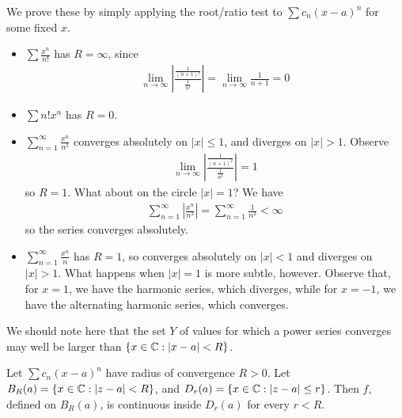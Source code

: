\documentclass{../template/note}
\begin{document}
    We prove these by simply applying the root/ratio test to \(\sum c_n (x-a)^n\) for some fixed \(x\).
    
    \begin{example*}
        \begin{itemize}
            \item \(\sum \frac{x^n}{n!}\) has \(R = \infty\), since 
            \begin{align*}
                \lim_{n \to \infty} \left|\frac{\frac 1{(n+1)!}}{\frac 1 {n!}}\right| = \lim_{n \to \infty} \frac 1 {n+1} = 0
            \end{align*}
            \item \(\sum n!x^n\) has \(R = 0\).
            \item \(\sum_{n=1}^\infty \frac{x^n}{n^2}\) converges absolutely on \(|x| \leq 1\), and diverges on \(|x| > 1\). Observe
            \begin{align*}
                \lim_{n \to \infty} \left|\frac{\frac 1 {(n+1)^2}}{\frac 1 {n^2}}\right| = 1
            \end{align*}
            so \(R = 1\). What about on the circle \(|x| = 1\)? We have
            \begin{align*}
                \sum_{n=1}^\infty \left|\frac{x^n}{n^2}\right| = \sum_{n=1}^\infty \frac 1 {n^2} < \infty
            \end{align*}
            so the series converges absolutely.
            \item \(\sum_{n=1}^\infty \frac{x^n}{n}\) has \(R=1\), so converges absolutely on \(|x| < 1\) and diverges on \(|x| > 1\). What happens when \(|x|=1\) is more subtle, however. Observe that, for \(x=1\), we have the harmonic series, which diverges, while for \(x=-1\), we have the alternating harmonic series, which converges.    
        \end{itemize}
    \end{example*}
    
    \begin{remark*}
        We should note here that the set \(Y\) of values for which a power series converges may well be larger than \(\{x \in \mathbb C: |x-a| < R\}\).
    \end{remark*}


    \begin{proposition}
        Let \(\sum c_n(x-a)^n\) have radius of convergence \(R > 0\). Let \(B_R(a) = \{x \in \mathbb C: |z-a| < R\}\), and \(D_r(a) = \{x \in \mathbb C: |z-a| \leq r\}\). Then \(f\), defined on \(B_R(a)\), is continuous inside \(D_r(a)\) for every \(r < R\).       
    \end{proposition}
    
\end{document}
